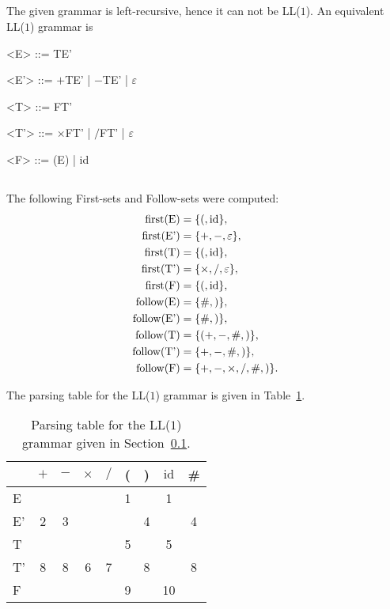\documentclass[11pt]{article}
\DeclareMathOperator{\first}{first}
\DeclareMathOperator{\follow}{follow}
\newcommand{\id}{\mathrm{id}}
\newcommand{\E}{\textnormal{E}}
\newcommand{\Ep}{\textnormal{E'}}
\newcommand{\T}{\textnormal{T}}
\newcommand{\Tp}{\textnormal{T'}}
\newcommand{\F}{\textnormal{F}}
\renewcommand{\epsilon}{\varepsilon}
\begin{document}
\subsection{}
\label{sec:2.1}
The given grammar is left-recursive, hence it can not be LL(\(1\)).
An equivalent LL(\(1\)) grammar is
\begin{grammar}
	<E> ::= TE'
	
	<E'> ::= \(+\)TE' | \(-\)TE' | \(\epsilon\)
	
	<T> ::= FT'
	
	<T'> ::= \(\times\)FT' | \(/\)FT' | \(\epsilon\)
	
	<F> ::= (E) | id
\end{grammar}

\subsection{}
The following First-sets and Follow-sets were computed:
\begin{align*}
\first(\E) &= \{(, \id\}, \\
\first(\Ep) &= \{+, -, \epsilon\}, \\
\first(\T) &= \{(, \id\}, \\
\first(\Tp) &= \{\times, /, \epsilon\}, \\
\first(\F) &= \{(, \id\}, \\
\follow(\E) &= \{\#, )\}, \\
\follow(\Ep) &= \{\#, )\}, \\
\follow(\T) &= \{(+, -, \#, )\}, \\
\follow(\Tp) &= \{+, -, \#, )\}, \\
\follow(\F) &= \{+, -, \times, /, \#, )\}.
\end{align*}

The parsing table for the LL(\(1\)) grammar is given in Table~\ref{tab:parsing}.
\begin{table}[H]
	\centering
	\begin{tabular}{l|cccccccc}
		\toprule
		 & \(+\) & \(-\) & \(\times\) & \(/\) & ( & ) & \(\id\) & \# \\
		\midrule
		E & & & & & 1 & & 1 & \\
		E' & 2 & 3 & & & & 4 & & 4 \\
		T & & & & & 5 & & 5 & \\
		T' & 8 & 8 & 6 & 7 & & 8 & & 8 \\
		F & & & & & 9 & & 10 & \\
		\bottomrule
	\end{tabular}
	\caption{Parsing table for the LL(\(1\)) grammar given in Section~\ref{sec:2.1}.}
	\label{tab:parsing}
\end{table}
\end{document}
